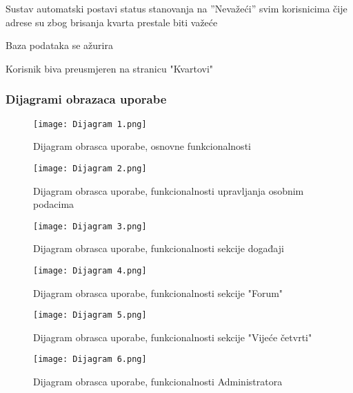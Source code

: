 \begin{packed_item}
\begin{packed_item}
\begin{packed_enum}
								\item Sustav automatski postavi status stanovanja na ”Nevažeći” svim korisnicima čije adrese su zbog brisanja kvarta prestale biti važeće
								\item Baza podataka se ažurira
								\item Korisnik biva preusmjeren na stranicu "Kvartovi"
							\end{packed_enum}
					\end{packed_item}
				\end{packed_item}
						
				\subsubsection{Dijagrami obrazaca uporabe}
					
				
				\begin{packed_item}					
					\item[] 
					\begin{figure}
					\centering
					\texttt{[image: Dijagram 1.png]}
					\caption{Dijagram obrasca uporabe, osnovne funkcionalnosti}
					\end{figure}
					
					\item[] \begin{figure}
					\centering
					\texttt{[image: Dijagram 2.png]}
					\caption{Dijagram obrasca uporabe, funkcionalnosti upravljanja osobnim podacima}
					\end{figure}
					
					\begin{figure}
					\centering
					\texttt{[image: Dijagram 3.png]}
					\caption{Dijagram obrasca uporabe, funkcionalnosti sekcije događaji}
					\end{figure}
					
					\begin{figure}
					\centering
					\texttt{[image: Dijagram 4.png]}
					\caption{Dijagram obrasca uporabe, funkcionalnosti sekcije "Forum"}
					\end{figure}
					
					\begin{figure}
					\centering
					\texttt{[image: Dijagram 5.png]}
					\caption{Dijagram obrasca uporabe, funkcionalnosti sekcije "Vijeće četvrti"}
					\end{figure}
					
					\begin{figure}
					\centering
					\texttt{[image: Dijagram 6.png]}
					\caption{Dijagram obrasca uporabe, funkcionalnosti Administratora}
					\end{figure}
				\end{packed_item}
				\eject	
				
